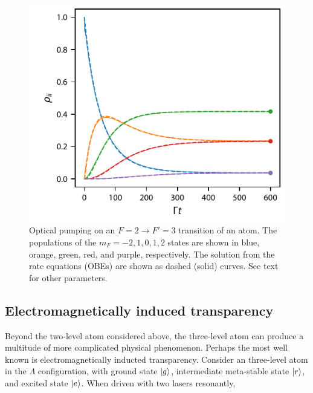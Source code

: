 \documentclass[final,5p,times,twocolumn]{elsarticle}
\begin{document}
\begin{figure}
	\center
	\includegraphics{figs/optical_pumping_f2_f3.pdf}
	\caption{\label{fig:optical_pumping} Optical pumping on an $F=2\rightarrow F'=3$ transition of an atom.  The populations of the $m_F=-2, 1, 0, 1, 2$ states are shown in blue, orange, green, red, and purple, respectively.  The solution from the rate equations (OBEs) are shown as dashed (solid) curves.  See text for other parameters.}
\end{figure}

\subsection{Electromagnetically induced transparency}
Beyond the two-level atom considered above, the three-level atom can produce a multitude of more complicated physical phenomenon.  Perhaps the most well known is electromagnetically inducted transparency.   Consider an three-level atom in the $\Lambda$ configuration, with ground state $\ket{g}$, intermediate meta-stable state $\ket{r}$, and excited state $\ket{e}$.  When driven with two lasers resonantly, 
\end{document}
